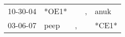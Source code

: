 \begin{supertabular}{p{0.07\textwidth}p{0.06\textwidth}p{0.02\textwidth}p{0.02\textwidth}p{0.06\textwidth}}
 10-30-04\textsuperscript{} &                   *OE1* &    &  , &  anuk\textsuperscript{} \\
 03-06-07\textsuperscript{} &  peep\textsuperscript{} &  , &    &                   *CE1* \\
\end{supertabular}
